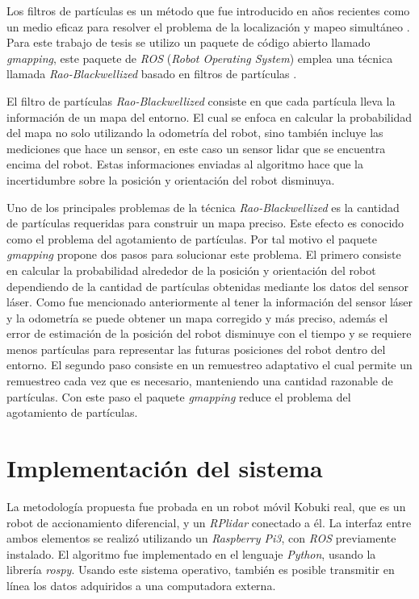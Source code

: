 Los filtros de partículas es un método que fue introducido en años recientes como un medio 
eficaz para resolver el problema de la localización y mapeo simultáneo 
\cite{nummiaro2003adaptive}. Para este trabajo de tesis se utilizo un paquete de código 
abierto llamado \textit{gmapping}, este paquete de \textit{ROS} (\textit{Robot Operating System}) 
emplea una técnica llamada \textit{Rao-Blackwellized} basado en filtros de partículas 
\cite{grisetti2007improved}.

El filtro de partículas \textit{Rao-Blackwellized} consiste en que cada partícula 
lleva la información de un mapa del entorno. El cual se enfoca en calcular la 
probabilidad del mapa no solo utilizando la odometría del robot, sino también incluye las 
mediciones que hace un sensor, en este caso un sensor lidar que se encuentra encima del 
robot. Estas informaciones enviadas al algoritmo hace que la incertidumbre sobre la 
posición y orientación del robot disminuya. 

Uno de los principales problemas de la técnica \textit{Rao-Blackwellized} es la cantidad 
de partículas requeridas para construir un mapa preciso. Este efecto es conocido como el 
problema del agotamiento de partículas. Por tal motivo el paquete \textit{gmapping} propone 
dos pasos para solucionar este problema. El primero consiste en calcular la probabilidad 
alrededor de la posición y orientación del robot dependiendo de la cantidad de partículas 
obtenidas mediante los datos del sensor láser. Como fue mencionado anteriormente al tener 
la información del sensor láser y la odometría se puede obtener un mapa corregido y más 
preciso, además el error de estimación de la posición del robot disminuye con el tiempo y 
se requiere menos partículas para representar las futuras posiciones del robot dentro del 
entorno. El segundo paso consiste en un remuestreo adaptativo el cual permite un remuestreo 
cada vez que es necesario, manteniendo una cantidad razonable de partículas. Con este paso 
el paquete \textit{gmapping} reduce el problema del agotamiento de partículas.


\section{Implementaci\'on del sistema}

La metodología propuesta fue probada en un robot móvil Kobuki real, que es un robot de 
accionamiento diferencial, y un \textit{RPlidar} conectado a él. La interfaz entre ambos elementos 
se realizó utilizando un \textit{Raspberry Pi3}, con \textit{ROS} previamente instalado.
El algoritmo fue implementado en el lenguaje \textit{Python}, usando la librería 
\textit{rospy}. Usando este sistema operativo, también es posible transmitir en línea los 
datos adquiridos a una computadora externa. 

